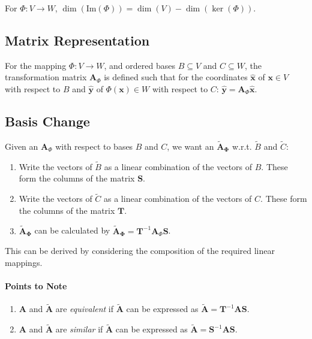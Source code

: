 \documentclass[10pt,twoside,twocolumn]{article}
\begin{document}
For $\Phi:V\rightarrow W$, $\dim\left(\mbox{Im}\left(\Phi\right)\right)=\dim\left(V\right)-\dim\left(\ker\left(\Phi\right)\right)$.


\subsection{Matrix Representation}

For the mapping $\Phi:V\rightarrow W$, and ordered bases $B\subseteq V$
and $C\subseteq W$, the transformation matrix $\mathbf{A}_{\Phi}$
is defined such that for the coordinates $\mathbf{\hat{x}}$ of $\mathbf{x}\in V$
with respect to $B$ and $\mathbf{\hat{y}}$ of $\Phi\left(\mathbf{x}\right)\in W$
with respect to $C$: $\mathbf{\hat{y}}=\mathbf{A}_{\Phi}\mathbf{\hat{x}}$.


\subsection{Basis Change}

Given an $\mathbf{A}_{\Phi}$ with respect to bases $B$ and $C$,
we want an $\mathbf{\tilde{A}_{\Phi}}$ w.r.t. $\tilde{B}$ and $\tilde{C}$: 
\begin{enumerate}
\item Write the vectors of $\tilde{B}$ as a linear combination of the vectors
of $B$. These form the columns of the matrix $\mathbf{S}$. 
\item Write the vectors of $\tilde{C}$ as a linear combination of the vectors
of $C$. These form the columns of the matrix $\mathbf{T}$. 
\item $\mathbf{\tilde{A}_{\Phi}}$ can be calculated by $\mathbf{\tilde{A}_{\Phi}}=\mathbf{T}^{-1}\mathbf{A}_{\Phi}\mathbf{S}$. 
\end{enumerate}
This can be derived by considering the composition of the required
linear mappings.


\paragraph{Points to Note}
\begin{enumerate}
\item $\mathbf{A}$ and $\mathbf{\tilde{A}}$ are \emph{equivalent} if $\mathbf{\tilde{A}}$
can be expressed as $\mathbf{\tilde{A}}=\mathbf{T}^{-1}\mathbf{A}\mathbf{S}$. 
\item $\mathbf{A}$ and $\mathbf{\tilde{A}}$ are \emph{similar} if $\mathbf{\tilde{A}}$
can be expressed as $\mathbf{\tilde{A}}=\mathbf{S}^{-1}\mathbf{A}\mathbf{S}$. 
\end{enumerate}
\end{document}
